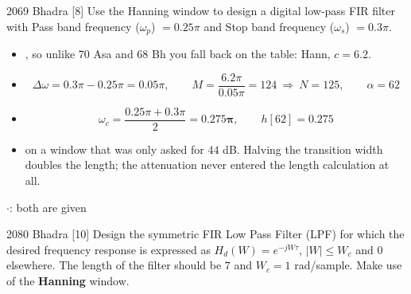 \begin{asked}{2069 Bhadra \textperiodcentered{} [8]}
Use the Hanning window to design a digital low-pass FIR filter with Pass band frequency
($\omega_p$) $=0.25\pi$ and Stop band frequency ($\omega_s$) $=0.3\pi$.
\end{asked}

\begin{itemize}
  \item {}, so unlike 70 Asa and 68 Bh you fall back on the
        table: Hann, $c=6.2$.
  \item[] \[ \Delta\omega=0.3\pi-0.25\pi=0.05\pi,\qquad
             M=\frac{6.2\pi}{0.05\pi}=124\ \Rightarrow\ \boxed{N=125},\qquad \alpha=62 \]
  \item[] \[ \omega_c=\frac{0.25\pi+0.3\pi}{2}=\mathbf{0.275\pi},\qquad h[62]=0.275 \]
  \item {} on a window that
        was only asked for $44$ dB. Halving the transition width doubles the length; the
        attenuation never entered the length calculation at all.
\end{itemize}

\hr

{\color{sub}\footnotesize {} 
\gap$\cdot$\gap {}: both are given}

\begin{asked}{2080 Bhadra \textperiodcentered{} [10]}
Design the symmetric FIR Low Pass Filter (LPF) for which the desired frequency response
is expressed as $H_d(W)=e^{-jW\tau}$, $|W|\le W_c$ and $0$ elsewhere. The length of the
filter should be $7$ and $W_c=1$ rad/sample. Make use of the \textbf{Hanning} window.
\end{asked}

